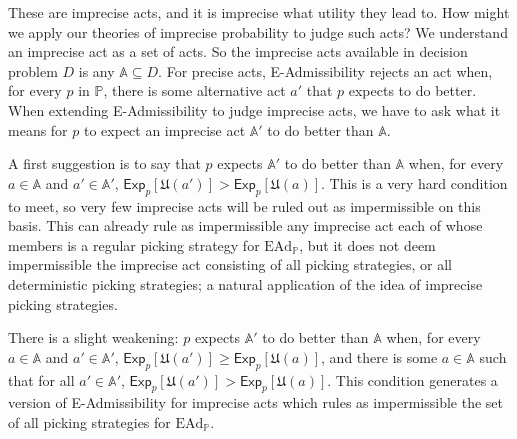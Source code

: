 \documentclass[a4paper]{article}
\renewcommand\P{\mathbb{P}} %
\newcommand\Exp{\mathsf{Exp}}
\newcommand\EAd{\mathrm{EAd}}
\newcommand\U{\mathfrak{U}} %
\newcommand{\IP}{\P}
\renewcommand{\color}[1]{}
\renewcommand{\geq}{\geqslant}
\newenvironment{CCM rewritten}
{\begingroup\color{blue}} %
{\endgroup}              %
\begin{document}

	{\color{blue}
	These are imprecise acts, and it is imprecise what utility they lead to. How might we apply our theories of imprecise probability to judge such acts? 	We understand an imprecise act as a set of acts. So the imprecise acts available in decision problem $D$ is any $\mathbb{A}\subseteq D$. 
	For precise acts, E-Admissibility rejects an act when, for every $p$ in $\IP$, there is some alternative act $a'$ that $p$ expects to do better. When extending E-Admissibility to judge imprecise acts, we have to ask what it means for $p$ to expect an imprecise act $\mathbb{A}'$ to do better than $\mathbb{A}$. 
	
	A first suggestion is to say that $p$ expects $\mathbb{A}'$ to do better than $\mathbb{A}$ when, for every $a\in\mathbb{A}$ and $a'\in\mathbb{A}'$, $\Exp_p[\U(a')]>\Exp_p[\U(a)]$. This is a very hard condition to meet, so very few imprecise acts will be ruled out as impermissible on this basis. This can already rule as impermissible any imprecise act each of whose members is a regular picking strategy for $\EAd_\IP$, but it does not deem impermissible the imprecise act consisting of all picking strategies, or all deterministic picking strategies; a natural application of the idea of imprecise picking strategies. 
	
	There is a slight weakening: $p$ expects $\mathbb{A}'$ to do better than $\mathbb{A}$ when, for every $a\in\mathbb{A}$ and $a'\in\mathbb{A}'$, $\Exp_p[\U(a')]\geq\Exp_p[\U(a)]$, and there is some $a\in\mathbb{A}$ such that for all $a'\in\mathbb{A}'$, $\Exp_p[\U(a')]>\Exp_p[\U(a)]$. 
	This condition generates a version of E-Admissibility for imprecise acts which rules as impermissible the set of all picking strategies for $\EAd_\IP$. 
	
}
\end{document}
